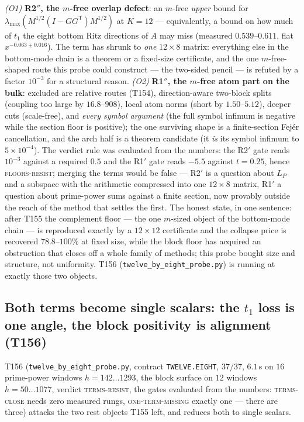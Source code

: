 \documentclass[11pt,a4paper]{article}
\begin{document}
\begin{keybox}
\emph{(O1)} \textbf{R2$''$, the $m$-free overlap defect}: an $m$-free \emph{upper} bound
for $\lambda_{\max}(M^{1/2}(I-GG^{\mathsf T})M^{1/2})$ at $K=12$ --- equivalently, a bound
on how much of $t_1$ the eight bottom Ritz directions of $A$ may miss (measured
$0.539$--$0.611$, flat $x^{-0.063\pm0.016}$). The term has shrunk to \emph{one}
$12\times8$ matrix: everything else in the bottom-mode chain is a theorem or a fixed-size
certificate, and the one $m$-free-shaped route this probe could construct --- the two-sided
pencil --- is refuted by a factor $10^{-3}$ for a structural reason. \emph{(O2)}
\textbf{R1$''$, the $m$-free atom part on the bulk}: excluded are relative routes (T154),
direction-aware two-block splits (coupling too large by $16.8$--$908$), local atom norms
(short by $1.50$--$5.12$), deeper cuts (scale-free), and \emph{every symbol argument} (the
full symbol infimum is negative while the section floor is positive); the one surviving
shape is a finite-section Fej\'er cancellation, and the arch half is a theorem candidate
(it \emph{is} its symbol infimum to $5\times10^{-4}$). The verdict rule was evaluated from
the numbers: the R2$'$ gate reads $10^{-3}$ against a required $0.5$ and the R1$'$ gate
reads $-5.5$ against $t=0.25$, hence \textsc{floors-resist}; merging the terms would be
false --- R2$'$ is a question about $L_P$ and a subspace with the arithmetic compressed
into one $12\times8$ matrix, R1$'$ a question about prime-power sums against a finite
section, now provably outside the reach of the method that settles the first. The honest
state, in one sentence: after T155 the complement floor --- the one $m$-sized object of the
bottom-mode chain --- is reproduced exactly by a $12\times12$ certificate and the collapse
price is recovered $78.8$--$100\%$ at fixed size, while the block floor has acquired an
obstruction that closes off a whole family of methods; this probe bought size and
structure, not uniformity.
T156 (\texttt{twelve\_by\_eight\_probe.py}) is running at exactly those two objects.
\end{keybox}

\subsection{Both terms become single scalars: the $t_1$ loss is one angle, the block
positivity is alignment (T156)}
T156 (\texttt{twelve\_by\_eight\_probe.py}, contract \texttt{TWELVE.EIGHT}, $37/37$,
$6.1$\,s on $16$ prime-power windows $h=142\ldots1293$, the block surface on $12$ windows
$h=50\ldots1077$, verdict \textsc{terms-resist}, the gates evaluated from the numbers:
\textsc{terms-close} needs zero measured rungs, \textsc{one-term-missing} exactly one ---
there are three) attacks the two rest objects T155 left, and reduces both to single
scalars.
\end{document}
